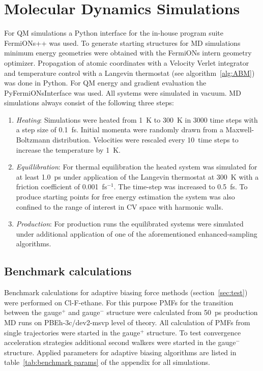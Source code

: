 \section{Molecular Dynamics Simulations}
\label{sec:comp MD}
For QM simulations a Python interface for the in-house program suite FermiONs++\autocite{kussmann2013pre,kussmann2017hybrid,laqua2018efficient} was used.
To generate starting structures for MD simulations minimum energy geometries were obtained with the FermiONs intern geometry optimizer.
Propagation of atomic coordinates with a Velocity Verlet\autocite{swope1982computer} integrator and temperature control with a Langevin thermostat\autocite{kroger2005models} (see algorithm~\ref{alg:ABM}) was done in Python.
For QM energy and gradient evaluation the PyFermiONsInterface was used.
All systems were simulated in vacuum.
MD simulations always consist of the following three steps:
\begin{enumerate}
  \item \textit{Heating}: Simulations were heated from 1~K to 300~K in 3000 time steps with a step size of 0.1~fs. Initial momenta were randomly drawn from a Maxwell-Boltzmann distribution. Velocities were rescaled every 10~time steps to increase the temperature by 1~K.
  \item \textit{Equillibration}: For thermal equilibration the heated system was simulated for at least 1.0~ps under application of the Langevin thermostat at 300~K with a friction coefficient of 0.001~fs$^{-1}$. The time-step was increased to 0.5~fs. To produce starting points for free energy estimation the system was also confined to the range of interest in CV space with harmonic walls.
  \item \textit{Production}: For production runs the equilibrated systems were simulated under additional application of one of the aforementioned enhanced-sampling algorithms.
\end{enumerate}

\subsection{Benchmark calculations}
Benchmark calculations for adaptive biasing force methods (section~\ref{sec:test}) were performed on Cl-F-ethane.
For this purpose PMFs for the transition between the gauge$^+$ and gauge$^-$ structure were calculated from 50~ps production MD runs on PBEh-3c/dev2-msvp\autocite{keal2005semiempirical} level of theory.
All calculation of PMFs from single trajectories were started in the gauge$^+$ structure.
To test convergence acceleration strategies additional second walkers were started in the gauge$^-$ structure.
Applied parameters for adaptive biasing algorithms are listed in table~\ref{tab:benchmark params} of the appendix for all simulations.
\newpage
